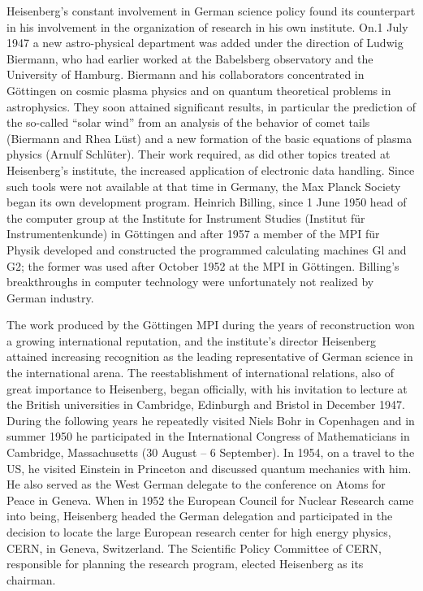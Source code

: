\documentclass{article}
\begin{document}
Heisenberg's constant involvement in German science policy found its counterpart in his involvement in the organization of research in his own institute. On.1 July 1947 a new astro-physical department was added under the direction of Ludwig Biermann, who had earlier worked at the Babelsberg observatory and the University of Hamburg. Biermann and his collaborators concentrated in Göttingen on cosmic plasma physics and on quantum theoretical problems in astrophysics. They soon attained significant results, in particular the prediction of the so-called “solar wind” from an analysis of the behavior of comet tails (Biermann and Rhea Lüst) and a new formation of the basic equations of plasma physics (Arnulf Schlüter). Their work required, as did other topics treated at Heisenberg's institute, the increased application of electronic data handling. Since such tools were not available at that time in Germany, the Max Planck Society began its own development program. Heinrich Billing, since 1 June 1950 head of the computer group at the Institute for Instrument Studies (Institut für Instrumentenkunde) in Göttingen and after 1957 a member of the MPI für Physik developed and constructed the programmed calculating machines Gl and G2; the former was used after October 1952 at the MPI in Göttingen. Billing's breakthroughs in computer technology were unfortunately not realized by German industry.

The work produced by the Göttingen MPI during the years of reconstruction won a growing international reputation, and the institute's director Heisenberg attained increasing recognition as the leading representative of German science in the international arena. The reestablishment of international relations, also of great importance to Heisenberg, began officially, with his invitation to lecture at the British universities in Cambridge, Edinburgh and Bristol in December 1947. During the following years he repeatedly visited Niels Bohr in Copenhagen and in summer 1950 he participated in the International Congress of Mathematicians in Cambridge, Massachusetts (30 August – 6 September). In 1954, on a travel to the US, he visited Einstein in Princeton and discussed quantum mechanics with him. He also served as the West German delegate to the conference on Atoms for Peace in Geneva. When in 1952 the European Council for Nuclear Research came into being, Heisenberg headed the German delegation and participated in the decision to locate the large European research center for high energy physics, CERN, in Geneva, Switzerland. The Scientific Policy Committee of CERN, responsible for planning the research program, elected Heisenberg as its chairman.
\end{document}
